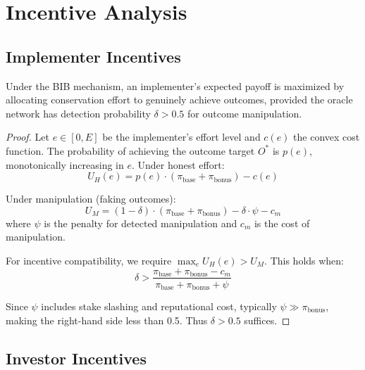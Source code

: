 \documentclass[11pt,a4paper]{article}
\begin{document}
\section{Incentive Analysis}
\label{sec:incentives}

\subsection{Implementer Incentives}

\begin{theorem}
Under the BIB mechanism, an implementer's expected payoff is maximized
by allocating conservation effort to genuinely achieve outcomes, provided
the oracle network has detection probability $\delta > 0.5$ for outcome
manipulation.
\end{theorem}

\begin{proof}
Let $e \in [0, E]$ be the implementer's effort level and $c(e)$ the
convex cost function. The probability of achieving the outcome target
$O^*$ is $p(e)$, monotonically increasing in $e$. Under honest effort:
\begin{equation}
  U_H(e) = p(e) \cdot (\pi_{\text{base}} + \pi_{\text{bonus}}) - c(e)
\end{equation}

Under manipulation (faking outcomes):
\begin{equation}
  U_M = (1 - \delta) \cdot (\pi_{\text{base}} + \pi_{\text{bonus}})
  - \delta \cdot \psi - c_m
\end{equation}
where $\psi$ is the penalty for detected manipulation and $c_m$ is the
cost of manipulation.

For incentive compatibility, we require $\max_e U_H(e) > U_M$. This
holds when:
\begin{equation}
  \delta > \frac{\pi_{\text{base}} + \pi_{\text{bonus}} - c_m}
  {\pi_{\text{base}} + \pi_{\text{bonus}} + \psi}
\end{equation}

Since $\psi$ includes stake slashing and reputational cost, typically
$\psi \gg \pi_{\text{bonus}}$, making the right-hand side less than
0.5. Thus $\delta > 0.5$ suffices.
\end{proof}

\subsection{Investor Incentives}
\end{document}

